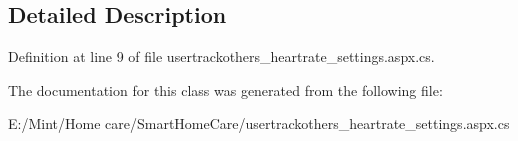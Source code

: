 \subsection{Detailed Description}


Definition at line 9 of file usertrackothers\-\_\-heartrate\-\_\-settings.\-aspx.\-cs.



The documentation for this class was generated from the following file\-:\begin{DoxyCompactItemize}
\item 
E\-:/\-Mint/\-Home care/\-Smart\-Home\-Care/usertrackothers\-\_\-heartrate\-\_\-settings.\-aspx.\-cs\end{DoxyCompactItemize}
